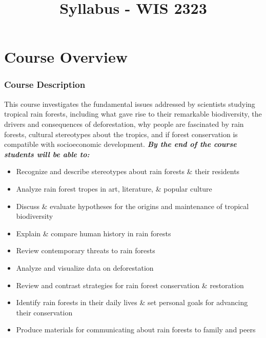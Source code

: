 \documentclass[
  10pt,
  letterpaper,
  oneside,
  open=any]{scrbook}
\title{Syllabus - WIS 2323}
\author{}
\date{}
\providecommand{\tightlist}{%
  \setlength{\itemsep}{0pt}\setlength{\parskip}{0pt}}
\renewcommand*\contentsname{Table of contents}
\newcommand\contentsname{Table of contents}
\begin{document}
\frontmatter
\maketitle

\renewcommand*\contentsname{Table of Contents}
{
\hypersetup{linkcolor=}
\setcounter{tocdepth}{0}
\tableofcontents
}

\mainmatter
{}

\chapter{Course Overview}\label{course-overview}

\subsection*{Course Description}\label{course-description}

This course investigates the fundamental issues addressed by scientists
studying tropical rain forests, including what gave rise to their
remarkable biodiversity, the drivers and consequences of deforestation,
why people are fascinated by rain forests, cultural stereotypes about
the tropics, and if forest conservation is compatible with socioeconomic
development. \textbf{\emph{By the end of the course students will be
able to:}}

\begin{itemize}
\tightlist
\item
  Recognize and describe stereotypes about rain forests \& their
  residents
\item
  Analyze rain forest tropes in art, literature, \& popular culture
\item
  Discuss \& evaluate hypotheses for the origins and maintenance of
  tropical biodiversity
\item
  Explain \& compare human history in rain forests
\item
  Review contemporary threats to rain forests
\item
  Analyze and visualize data on deforestation
\item
  Review and contrast strategies for rain forest conservation \&
  restoration
\item
  Identify rain forests in their daily lives \& set personal goals for
  advancing their conservation
\item
  Produce materials for communicating about rain forests to family and
  peers
\end{itemize}
\end{document}
